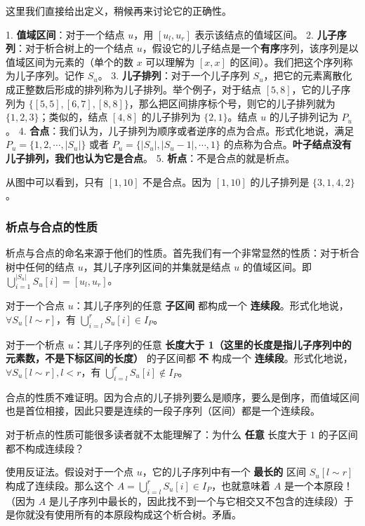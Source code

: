 \documentclass[12pt]{ctexart}
\begin{document}
这里我们直接给出定义，稍候再来讨论它的正确性。

1. \textbf{值域区间}：对于一个结点 $u$，用 $[u_l,u_r]$ 表示该结点的值域区间。
2. \textbf{儿子序列}：对于析合树上的一个结点 $u$，假设它的儿子结点是一个\textbf{有序}序列，该序列是以值域区间为元素的（单个的数 $x$ 可以理解为 $[x,x]$ 的区间）。我们把这个序列称为儿子序列。记作 $S_u$。
3. \textbf{儿子排列}：对于一个儿子序列 $S_u$，把它的元素离散化成正整数后形成的排列称为儿子排列。举个例子，对于结点 $[5,8]$，它的儿子序列为 $\{[5,5],[6,7],[8,8]\}$，那么把区间排序标个号，则它的儿子排列就为 $\{1,2,3\}$；类似的，结点 $[4,8]$ 的儿子排列为 $\{2,1\}$。结点 $u$ 的儿子排列记为 $P_u$。
4. \textbf{合点}：我们认为，儿子排列为顺序或者逆序的点为合点。形式化地说，满足 $P_u=\{1,2,\cdots,|S_u|\}$ 或者 $P_u=\{|S_u|,|S_u-1|,\cdots,1\}$ 的点称为合点。\textbf{叶子结点没有儿子排列，我们也认为它是合点}。
5. \textbf{析点}：不是合点的就是析点。

从图中可以看到，只有 $[1,10]$ 不是合点。因为 $[1,10]$ 的儿子排列是 $\{3,1,4,2\}$。

\subsubsection{析点与合点的性质}

析点与合点的命名来源于他们的性质。首先我们有一个非常显然的性质：对于析合树中任何的结点 $u$，其儿子序列区间的并集就是结点 $u$ 的值域区间。即 $\bigcup_{i=1}^{|S_u|}S_u[i]=[u_l,u_r]$。

对于一个合点 $u$：其儿子序列的任意 \textbf{子区间} 都构成一个 \textbf{连续段}。形式化地说，$\forall S_u[l\sim r]$，有 $\bigcup_{i=l}^rS_u[i]\in I_P$。

对于一个析点 $u$：其儿子序列的任意 \textbf{长度大于 1（这里的长度是指儿子序列中的元素数，不是下标区间的长度）} 的子区间都 \textbf{不} 构成一个 \textbf{连续段}。形式化地说，$\forall S_u[l\sim r],l<r$，有 $\bigcup_{i=l}^rS_u[i]\notin I_P$。

合点的性质不难证明。因为合点的儿子排列要么是顺序，要么是倒序，而值域区间也是首位相接，因此只要是连续的一段子序列（区间）都是一个连续段。

对于析点的性质可能很多读者就不太能理解了：为什么 \textbf{任意} 长度大于 $1$ 的子区间都不构成连续段？

使用反证法。假设对于一个点 $u$，它的儿子序列中有一个 \textbf{最长的} 区间 $S_u[l\sim r]$ 构成了连续段。那么这个 $A=\bigcup_{i=l}^rS_u[i]\in I_P$，也就意味着 $A$ 是一个本原段！（因为 $A$ 是儿子序列中最长的，因此找不到一个与它相交又不包含的连续段）于是你就没有使用所有的本原段构成这个析合树。矛盾。
\end{document}
